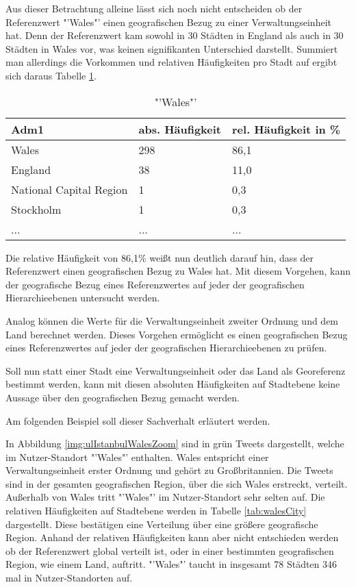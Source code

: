 			Aus dieser Betrachtung alleine lässt sich noch nicht entscheiden ob der Referenzwert "'Wales"' einen geografischen Bezug zu einer Verwaltungseinheit hat.
			Denn der Referenzwert kam sowohl in 30 Städten in England als auch in 30 Städten in Wales vor, was keinen signifikanten Unterschied darstellt. 
			Summiert man allerdings die Vorkommen und relativen Häufigkeiten pro Stadt auf ergibt sich daraus Tabelle \ref{tab:WalesVerw1}.

			\begin{table}[h]
			\centering
			\caption{"'Wales"'}
			\label{tab:WalesVerw1}
			\begin{tabular}{|l|l|l|}
			\hline
			Adm1 & abs. Häufigkeit & rel. Häufigkeit in \% \\ \hline \hline
			Wales                   & 298 & 86,1 \\ \hline
			England                 & 38  & 11,0 \\ \hline
			National Capital Region & 1   & 0,3  \\ \hline
			Stockholm               & 1   & 0,3  \\ \hline
			... & ... & ... \\ \hline
			\end{tabular}
			\end{table}  

			Die relative Häufigkeit von 86,1\% weißt nun deutlich darauf hin, dass der Referenzwert einen geografischen Bezug zu Wales hat.
			Mit diesem Vorgehen, kann der geografische Bezug eines Referenzwertes auf jeder der geografischen Hierarchieebenen untersucht werden.

			Analog können die Werte für die Verwaltungseinheit zweiter Ordnung und dem Land berechnet werden.
			Dieses Vorgehen ermöglicht es einen geografischen Bezug eines Referenzwertes auf jeder der geografischen Hierarchieebenen zu prüfen.


			Soll nun statt einer Stadt eine Verwaltungseinheit oder das Land als Georeferenz bestimmt werden, kann mit diesen absoluten Häufigkeiten auf Stadtebene keine Aussage über den geografischen Bezug gemacht werden. 
			
			Am folgenden Beispiel soll dieser Sachverhalt erläutert werden.

			In Abbildung \ref{img:ulIstanbulWalesZoom} sind in grün Tweets dargestellt, welche im Nutzer-Standort "'Wales"' enthalten.
			Wales entspricht einer Verwaltungseinheit erster Ordnung und gehört zu Großbritannien.
			Die Tweets sind in der gesamten geografischen Region, über die sich Wales erstreckt, verteilt.
			Außerhalb von Wales tritt "'Wales"' im Nutzer-Standort sehr selten auf.
			Die relativen Häufigkeiten auf Stadtebene werden in Tabelle \ref{tab:walesCity} dargestellt.
			Diese bestätigen eine Verteilung über eine größere geografische Region.
			Anhand der relativen Häufigkeiten kann aber nicht entschieden werden ob der Referenzwert global verteilt ist, oder in einer bestimmten geografischen Region, wie einem Land, auftritt. 
			"'Wales"' taucht in insgesamt 78 Städten 346 mal in Nutzer-Standorten auf.

